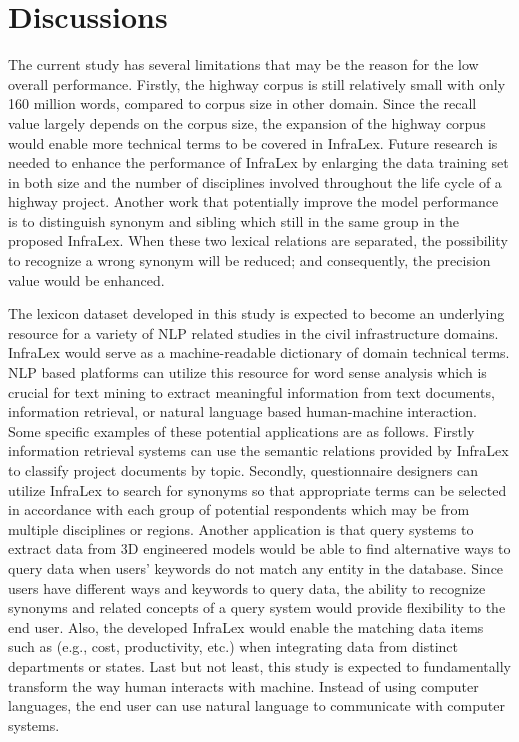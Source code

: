 \documentclass[Journal, InsideFigs, DoubleSpace]{ascelike} %
\begin{document}
%
\section{Discussions} \label{sec:dis}
The current study has several limitations that may be the reason for the low overall performance. Firstly, the highway corpus is still relatively small with only 160 million words, compared to corpus size in other domain. Since the recall value largely depends on the corpus size, the expansion of the highway corpus would enable more technical terms to be covered in InfraLex. Future research is needed to enhance the performance of InfraLex by enlarging the data training set in both size and the number of disciplines involved throughout the life cycle of a highway project. Another work that potentially improve the model performance is to distinguish synonym and sibling which still in the same group in the proposed InfraLex. When these two lexical relations are separated, the possibility to recognize a wrong synonym will be reduced; and consequently, the precision value would be enhanced.
\par
The lexicon dataset developed in this study is expected to become an underlying resource for a variety of NLP related studies in the civil infrastructure domains. InfraLex would serve as a machine-readable dictionary of domain technical terms. NLP based platforms can utilize this resource for word sense analysis which is crucial for text mining to extract meaningful information from text documents, information retrieval, or natural language based human-machine interaction. Some specific examples of these potential applications are as follows. Firstly information retrieval systems can use the semantic relations provided by InfraLex to classify project documents by topic. Secondly, questionnaire designers can utilize InfraLex to search for synonyms so that appropriate terms can be selected in accordance with each group of potential respondents which may be from multiple disciplines or regions. Another application is that query systems to extract data from 3D engineered models would be able to find alternative ways to query data when users' keywords do not match any entity in the database. Since users have different ways and keywords to query data, the ability to recognize synonyms and related concepts of a query system would provide flexibility to the end user. Also, the developed InfraLex would enable the matching data items such as (e.g., cost, productivity, etc.) when integrating data from distinct departments or states. Last but not least, this study is expected to fundamentally transform the way human interacts with machine. Instead of using computer languages, the end user can use natural language to communicate with computer systems.
\par
%
\end{document}
